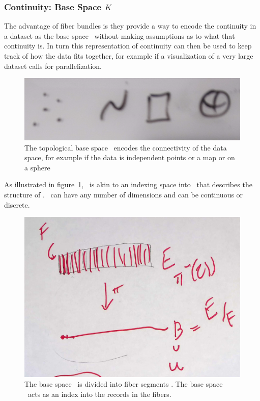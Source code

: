 \documentclass[../main.tex]{subfiles}
\begin{document}
\subsubsection{Continuity: Base Space $K$} 
\label{sec:data_base}
The advantage of fiber bundles is they provide a way to encode the continuity in a dataset as the base space \dbase\ without making assumptions as to what that continuity is. In turn this representation of continuity can then be used to keep track of how the data fits together, for example if a visualization of a very large dataset calls for parallelization.  

\begin{figure}[H]
    \includegraphics[width=.5\textwidth]{figures/math/k_different_types.png}
    \caption{The topological base space \dbase\ encodes the connectivity of the data space, for example if the data is independent points or a map or on a sphere}
    \label{fig:base_space_types}
\end{figure}
As illustrated in figure~\ref{fig:base_space_types}, \dbase\ is akin to an indexing space into \dtotal\ that describes the structure of \dtotal.  \dbase\ can have any number of dimensions and can be continuous or discrete. 

\begin{figure}[H]
    \includegraphics[width=.5\linewidth]{figures/math/k_qspace.png}
    \caption{The base space \dtotal\ is divided into fiber segments \dfiber. The base space \dbase\ acts as an index into the records in the fibers.
    }
    \label{fig:base_space_div}
\end{figure}
\end{document}
